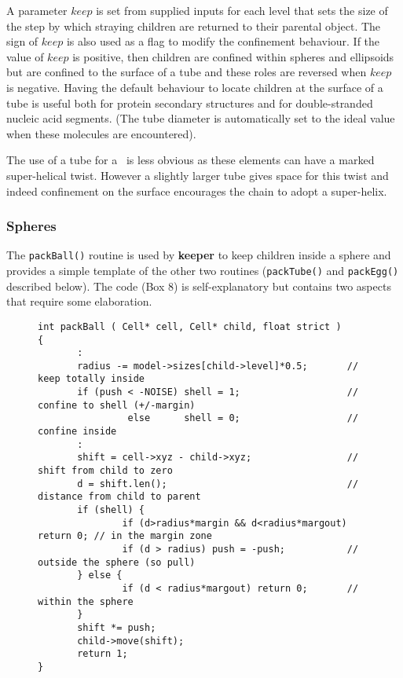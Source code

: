 \documentclass[review]{elsarticle}
\newcommand{\TT}[1]{{\ttfamily\bfseries #1}}
\begin{document}
{{{{{A parameter $keep$ is set from supplied inputs for each level that sets
the size of the step by which straying children are returned to their parental
object.   The sign of $keep$ is also used as a flag to modify the confinement
behaviour.  If the value of $keep$ 
is positive, then children are confined within spheres and ellipsoids but
are confined to the surface of a tube and these roles are reversed when
$keep$ is negative.   Having the default behaviour to locate children at the
surface of a tube is useful both for protein secondary structures and for
double-stranded nucleic acid segments.  (The tube diameter is automatically
set to the ideal value when these molecules are encountered).  

The use of a tube for a \Bs\ is less obvious as these elements can have a marked 
super-helical twist. However a slightly larger tube gives space for this twist
and indeed confinement on the surface encourages the chain to adopt a super-helix.   

\subsubsection{Spheres}

The {\tt packBall()} routine is used by \TT{keeper} to keep children inside a sphere and
provides a simple template of the other two routines ({\tt packTube()} and {\tt packEgg()}
described below).    The code (Box 8) is self-explanatory but contains two aspects that
require some elaboration.

\begin{figure}[h]
\centering
\begin{tiny}
\begin{Verbatim}[frame=single]
int packBall ( Cell* cell, Cell* child, float strict )
{
       :
       radius -= model->sizes[child->level]*0.5;       // keep totally inside
       if (push < -NOISE) shell = 1;                   // confine to shell (+/-margin)
                else      shell = 0;                   // confine inside
       :
       shift = cell->xyz - child->xyz;                 // shift from child to zero
       d = shift.len();                                // distance from child to parent
       if (shell) {
               if (d>radius*margin && d<radius*margout) return 0; // in the margin zone
               if (d > radius) push = -push;           // outside the sphere (so pull)
       } else {
               if (d < radius*margout) return 0;       // within the sphere
       }
       shift *= push;
       child->move(shift);
       return 1;
}


\end{Verbatim}
\end{tiny}
\end{figure}}}}}}
\end{document}
